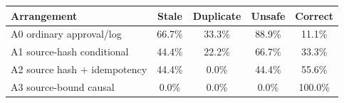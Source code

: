 \begin{center}
\label{tab:source-bound-causal-ablation}
\par\vspace{0.6\baselineskip}
\small
\setlength{\tabcolsep}{4pt}
\begin{tabularx}{\linewidth}{@{}>{\raggedright\arraybackslash}Xcccc@{}}
\toprule
Arrangement & Stale & Duplicate & Unsafe & Correct \\
\midrule
A0 ordinary approval/log & 66.7\% & 33.3\% & 88.9\% & 11.1\% \\
A1 source-hash conditional & 44.4\% & 22.2\% & 66.7\% & 33.3\% \\
A2 source hash + idempotency & 44.4\% & 0.0\% & 44.4\% & 55.6\% \\
A3 source-bound causal & 0.0\% & 0.0\% & 0.0\% & 100.0\% \\
\bottomrule
\end{tabularx}
\end{center}
